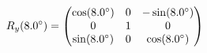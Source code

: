 \documentclass[preview]{standalone}
\begin{document}
\begin{align*}
\special{dvisvgm:raw <g id='unique000'>}R_y(8.0^\circ) = \begin{pmatrix} \cos(8.0^\circ) & 0 & -\sin(8.0^\circ) \\ 0 & 1 & 0 \\ \sin(8.0^\circ) & 0 & \cos(8.0^\circ) \end{pmatrix}\special{dvisvgm:raw </g>}
\end{align*}
\end{document}

